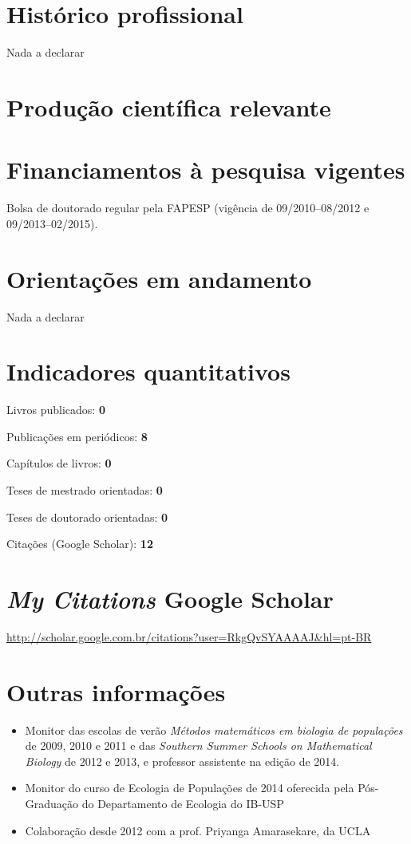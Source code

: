 \documentclass[a4paper ,11pt]{article}
\renewenvironment{enumerate}{
  \begin{list}{}{
    \setlength{\leftmargin}{2em}
  }
}{
  \end{list}
}
\begin{document}
\section{Histórico profissional}
Nada a declarar

\section{Produção científica relevante}

\renewcommand{\refname}{Artigos}

\nocite{*}



\section{Financiamentos à pesquisa vigentes}

Bolsa de doutorado regular pela FAPESP (vigência de 09/2010--08/2012 e 09/2013--02/2015).

\section{Orientações em andamento}
Nada a declarar

\section{Indicadores quantitativos}
\begin{enumerate}
    \item Livros publicados: \textbf{0}
    \item Publicações em periódicos: \textbf{8}
    \item Capítulos de livros: \textbf{0}
    \item Teses de mestrado orientadas: \textbf{0}
    \item Teses de doutorado orientadas: \textbf{0}
    \item Citações (Google Scholar): \textbf{12}
\end{enumerate}

\section{\emph{My Citations} Google Scholar}
\url{http://scholar.google.com.br/citations?user=RkgQvSYAAAAJ&hl=pt-BR}

\section{Outras informações}
\begin{itemize}
    \item Monitor das escolas de verão \emph{Métodos matemáticos em biologia de
populações} de 2009, 2010 e 2011 e das \emph{Southern Summer Schools on Mathematical
Biology} de 2012 e 2013, e professor assistente na edição de 2014.
    \item Monitor do curso de Ecologia de Populações de 2014 oferecida pela Pós-Graduação do Departamento de
Ecologia do IB-USP
    \item Colaboração desde 2012 com a prof. Priyanga Amarasekare, da UCLA
\end{itemize}
\end{document}
